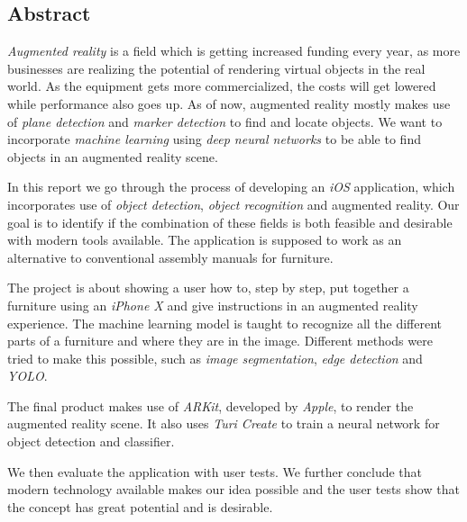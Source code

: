 \begin{center}
\section*{Abstract}
\end{center}
\textit{Augmented reality} is a field which is getting increased funding every year, as more businesses are realizing the potential of rendering virtual objects in the real world. As the equipment gets more commercialized, the costs will get lowered while performance also goes up. As of now, augmented reality mostly makes use of \textit{plane detection} and \textit{marker detection} to find and locate objects. We want to incorporate \textit{machine learning} using \textit{deep neural networks} to be able to find objects in an augmented reality scene. 

In this report we go through the process of developing an \textit{iOS} application, which incorporates use of \textit{object detection}, \textit{object recognition} and augmented reality. Our goal is to identify if the combination of these fields is both feasible and desirable with modern tools available. The application is supposed to work as an alternative to conventional assembly manuals for furniture. 

The project is about showing a user how to, step by step, put together a furniture using an \textit{iPhone X} and give instructions in an augmented reality experience.
The machine learning model is taught to recognize all the different parts of a furniture and where they are in the image. Different methods were tried to make this possible, such as \textit{image segmentation}, \textit{edge detection} and \textit{YOLO}.

The final product makes use of \textit{ARKit}, developed by \textit{Apple}, to render the augmented reality scene. It also uses \textit{Turi Create} to train a neural network for object detection and classifier. 

We then evaluate the application with user tests. We further conclude that modern technology available makes our idea possible and the user tests show that the concept has great potential and is desirable.
\newpage